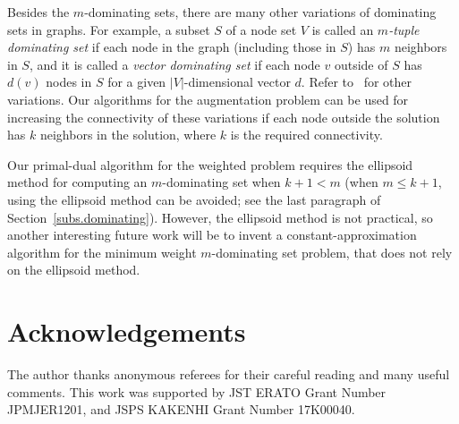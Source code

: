 \documentclass[11pt]{article}
\begin{document}
 
 
 Besides the $m$-dominating sets,
  there are many other variations of dominating sets in graphs. For example,
  a subset $S$ of a node set $V$ is called an \emph{$m$-tuple dominating set}
  if each node in the graph (including those in $S$)
  has $m$ neighbors in $S$,
  and it is called a \emph{vector dominating set}
  if each node $v$ outside of $S$ has $d(v)$ nodes in $S$
  for a given $|V|$-dimensional vector $d$.
  Refer to~\cite{CicaleseMV13} for other variations.
  Our algorithms for the augmentation problem can be used for
  increasing the connectivity of 
  these  variations if each node outside the solution has $k$
  neighbors
  in the solution, where $k$ is the required connectivity.
  
 
 Our primal-dual algorithm
 for the weighted problem
 requires the ellipsoid method
 for computing an $m$-dominating set when $k+1 < m$ (when $m \leq k+1$,
 using the ellipsoid method can be avoided; see the last paragraph of Section~\ref{subs.dominating}).
 However, the ellipsoid method is not practical, so 
another interesting future work will be to invent a
 constant-approximation algorithm for the minimum weight $m$-dominating
 set problem, that does not rely on the ellipsoid method.

\section*{Acknowledgements}
The author thanks anonymous referees for their careful reading and many useful comments.
This work was supported by JST ERATO Grant Number JPMJER1201, and
JSPS KAKENHI Grant Number 17K00040.
\end{document}
